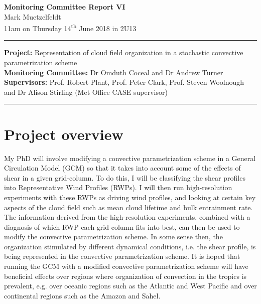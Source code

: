 \documentclass[11pt,a4paper]{article}
\newcommand{\ts}{\textsuperscript}
\begin{document}

\begin{center}
    \Large{\textbf{Monitoring Committee Report VI}}\\[0.1cm]
    \large{Mark Muetzelfeldt}\\
    \normalsize{11am on Thursday 14\ts{th} June 2018 in 2U13}\\[0.1cm]		
    \rule{\textwidth}{0.2mm}
    \textbf{Project: }Representation of cloud field organization in a stochastic convective parametrization scheme\\
    \textbf{Monitoring Committee: }Dr Omduth Coceal and  Dr Andrew Turner\\
    \textbf{Supervisors: }Prof. Robert Plant, Prof. Peter Clark, Prof. Steven Woolnough \\
    and Dr Alison Stirling (Met Office CASE supervisor)\\
    \rule{\textwidth}{0.2mm}
\end{center}

\section{Project overview}
\label{sec:Project Overview}

My PhD will involve modifying a convective parametrization scheme in a General Circulation Model (GCM) so that it takes into account some of the effects of shear in a given grid-column. To do this, I will be classifying the shear profiles into Representative Wind Profiles (RWPs). I will then run high-resolution experiments with these RWPs as driving wind profiles, and looking at certain key aspects of the cloud field such as mean cloud lifetime and bulk entrainment rate. The information derived from the high-resolution experiments, combined with a diagnosis of which RWP each grid-column fits into best, can then be used to modify the convective parametrization scheme. In some sense then, the organization stimulated by different dynamical conditions, i.e. the shear profile, is being represented in the convective parametrization scheme. It is hoped that running the GCM with a modified convective parametrization scheme will have beneficial effects over regions where organization of convection in the tropics is prevalent, e.g. over oceanic regions such as the Atlantic and West Pacific and over continental regions such as the Amazon and Sahel.
\end{document}
